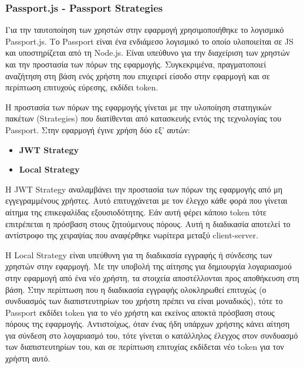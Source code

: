 \subsubsection{Passport.js - Passport Strategies}

Για την ταυτοποίηση των χρηστών στην εφαρμογή χρησιμοποιήθηκε το λογισμικό Passport.js. Το Passport είναι ένα ενδιάμεσο λογισμικό το οποίο υλοποιείται σε JS και υποστηρίζεται από τη Node.js. Eίναι υπεύθυνο για την διαχείριση των χρηστών και την προστασία των πόρων της εφαρμογής. Συγκεκριμένα, πραγματοποιεί αναζήτηση στη βάση ενός χρήστη που επιχειρεί είσοδο στην εφαρμογή και σε περίπτωση επιτυχούς εύρεσης, εκδίδει token.

Η προστασία των πόρων της εφαρμογής γίνεται με την υλοποίηση στατηγικών πακέτων (Strategies) που διατίθενται από κατασκευής εντός της τεχνολογίας του Passport. Στην εφαρμογή έγινε χρήση δύο εξ' αυτών:

\begin{itemize}
    \item {}\textbf{JWT Strategy}
    \item {}\textbf{Local Strategy}
\end{itemize}

Η JWT Strategy αναλαμβάνει την προστασία των πόρων της εφαρμογής από μη εγγεγραμμένους χρήστες. Αυτό επιτυγχάνεται με τον έλεγχο κάθε φορά που γίνεται αίτημα της επικεφαλίδας εξουσιοδότητης. Εάν αυτή φέρει κάποιο token τότε επιτρέπεται η πρόσβαση στους ζητούμενους πόρους. Αυτή η διαδικασία αποτελεί το αντίστροφο της χειραψίας που αναφέρθηκε νωρίτερα μεταξύ client-server.

Η Local Strategy είναι υπεύθυνη για τη διαδικασία εγγραφής ή σύνδεσης των χρηστών στην εφαρμογή. Με την υποβολή της αίτησης για δημιουργία λογαριασμού στην εφαρμογή από ένα νέο χρήστη, τα στοιχεία αποστέλλονται προς αποθήκευση στη βάση. Στην περίπτωση που η διαδικασία εγγραφής ολοκληρωθεί επιτυχώς (ο συνδυασμός των διαπιστευτηρίων του χρήστη πρέπει να είναι μοναδικός), τότε το Passport εκδίδει token για το νέο χρήστη και εκείνος αποκτά πρόσβαση στους πόρους της εφαρμογής. Αντιστοίχως, όταν ένας ήδη υπάρχων χρήστης κάνει αίτηση για σύνδεση στο λογαριασμό του, τότε γίνεται ο κατάλληλος έλεγχος στον συνδυασμό των διαπιστευτηρίων του, και σε περίπτωση επιτυχίας εκδίδεται νέο token για τον χρήστη αυτό. 

